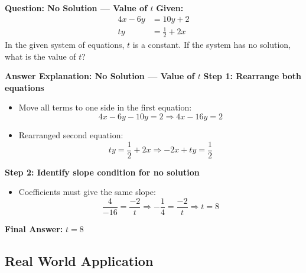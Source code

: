 \documentclass{beamer}
\begin{document}
\begin{frame}{\textbf{Question: No Solution — Value of \( t \)}}
    \textbf{Given:}
    \[
    \begin{aligned}
        4x - 6y &= 10y + 2 \\
        ty &= \frac{1}{2} + 2x
    \end{aligned}
    \]
    In the given system of equations, $t$ is a constant. If the system has no solution, what is the value of $t$?
\end{frame}


\begin{frame}{\textbf{Answer Explanation: No Solution — Value of \( t \)}}
    \small
    \textbf{Step 1: Rearrange both equations}
    \begin{itemize}
        \item Move all terms to one side in the first equation:
        \[
        4x - 6y - 10y = 2 \Rightarrow 4x - 16y = 2
        \]
        \item Rearranged second equation:
        \[
        ty = \frac{1}{2} + 2x \Rightarrow -2x + ty = \frac{1}{2}
        \]
    \end{itemize}

    \textbf{Step 2: Identify slope condition for no solution}
    \begin{itemize}
        \item Coefficients must give the same slope:
        \[
        \frac{4}{-16} = \frac{-2}{t} \Rightarrow -\frac{1}{4} = \frac{-2}{t}
        \Rightarrow t = 8
        \]
    \end{itemize}

    \begin{center}
        \textbf{Final Answer:} \( \boxed{t = 8} \)
    \end{center}
\end{frame}



\begin{frame}
\section{Real World Application}
\end{frame}
\end{document}
